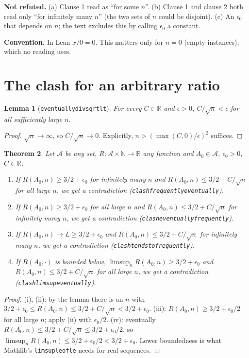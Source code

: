 \documentclass[11pt]{article}
\renewcommand{\_}{\oldus\allowbreak}
\newtheorem{theorem}{Theorem}
\newtheorem{lemma}[theorem]{Lemma}
\theoremstyle{definition}
\theoremstyle{remark}
\begin{document}
\textbf{Not refuted.} (a) Clause 1 read as ``for some $n$''. (b) Clause 1 and clause 2 both read
only ``for infinitely many $n$'' (the two sets of $n$ could be disjoint). (c) An $\epsilon_0$ that
depends on $n$; the text excludes this by calling $\epsilon_0$ a constant.

\textbf{Convention.} In Lean $x/0=0$. This matters only for $n=0$ (empty instances), which no
reading uses.

\section{The clash for an arbitrary ratio}

\begin{lemma}[\texttt{eventually\_div\_sqrt\_lt}]
For every $C\in\mathbb{R}$ and $\epsilon>0$, $C/\sqrt{n}<\epsilon$ for all sufficiently large $n$.
\end{lemma}
\begin{proof}
$\sqrt{n}\to\infty$, so $C/\sqrt{n}\to 0$. Explicitly, $n>(\max(C,0)/\epsilon)^2$ suffices.
\end{proof}

\begin{theorem}\label{thm:abstract}
Let $\mathcal{A}$ be any set, $R:\mathcal{A}\times\mathbb{N}\to\mathbb{R}$ any function and
$A_0\in\mathcal{A}$, $\epsilon_0>0$, $C\in\mathbb{R}$.
\begin{enumerate}[label=(\roman*)]
\item If $R(A_0,n)\ge 3/2+\epsilon_0$ for infinitely many $n$ and
  $R(A_0,n)\le 3/2+C/\sqrt{n}$ for all large $n$, we get a contradiction
  (\texttt{clash\_frequently\_eventually}).
\item If $R(A_0,n)\ge 3/2+\epsilon_0$ for all large $n$ and
  $R(A_0,n)\le 3/2+C/\sqrt{n}$ for infinitely many $n$, we get a contradiction
  (\texttt{clash\_eventually\_frequently}).
\item If $R(A_0,n)\to L\ge 3/2+\epsilon_0$ and $R(A_0,n)\le 3/2+C/\sqrt{n}$ for infinitely many $n$,
  we get a contradiction (\texttt{clash\_tendsto\_frequently}).
\item If $R(A_0,\cdot)$ is bounded below, $\limsup_n R(A_0,n)\ge 3/2+\epsilon_0$ and
  $R(A_0,n)\le 3/2+C/\sqrt{n}$ for all large $n$, we get a contradiction
  (\texttt{clash\_limsup\_eventually}).
\end{enumerate}
\end{theorem}
\begin{proof}
(i), (ii): by the lemma there is an $n$ with $3/2+\epsilon_0\le R(A_0,n)\le 3/2+C/\sqrt{n}<3/2+\epsilon_0$.
(iii): $R(A_0,n)\ge 3/2+\epsilon_0/2$ for all large $n$; apply (ii) with $\epsilon_0/2$.
(iv): eventually $R(A_0,n)\le 3/2+C/\sqrt{n}\le 3/2+\epsilon_0/2$, so
$\limsup_n R(A_0,n)\le 3/2+\epsilon_0/2<3/2+\epsilon_0$. Lower boundedness is what Mathlib's
\texttt{limsup\_le\_of\_le} needs for real sequences.
\end{proof}
\end{document}
